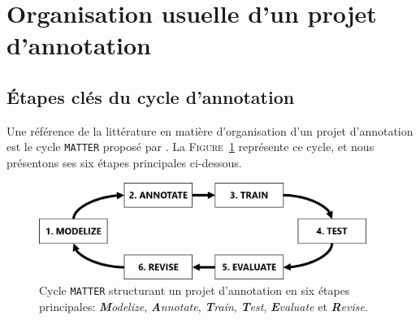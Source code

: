 	
    \section{Organisation usuelle d'un projet d'annotation}
	\label{section:2.2-ORGANISATION-ANNOTATION}
		
		
		\subsection{Étapes clés du cycle d'annotation}
		\label{section:2.2.1-ORGANISATION-ANNOTATION-ETAPES-CLES}
		
			
			Une référence de la littérature en matière d'organisation d'un projet d'annotation est le cycle \texttt{MATTER} proposé par \cite{pustejovsky-stubbs:2012:natural-language-annotation}.
			La \textsc{Figure~\ref{figure:2.2.1-ORGANISATION-ANNOTATION-ETAPES-CLES-MATTER}} représente ce cycle, et nous présentons ses six étapes principales ci-dessous.
			
			\begin{figure}[!htb]
				\centering
				\includegraphics[width=0.95\textwidth]{figures/etatdelart-pustejovsky-2012-cycle-matter}
				\caption{
					Cycle \texttt{MATTER} structurant un projet d'annotation en six étapes principales: \textit{\textbf{M}odelize}, \textit{\textbf{A}nnotate}, \textit{\textbf{T}rain}, \textit{\textbf{T}est}, \textit{\textbf{E}valuate} et \textit{\textbf{R}evise}.
				}
				\label{figure:2.2.1-ORGANISATION-ANNOTATION-ETAPES-CLES-MATTER}
			\end{figure}
			
